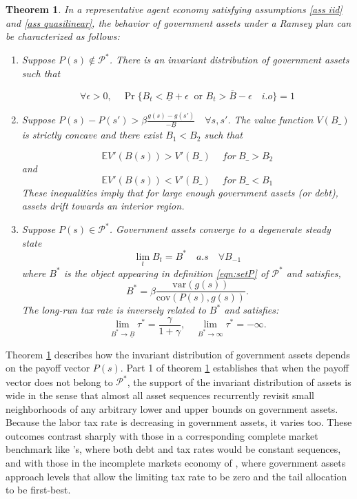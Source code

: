 \documentclass[thmsb,11pt]{article}
\newtheorem{theorem}{Theorem}
\newcommand{\var}{\mathrm{var}}
\newcommand{\cov}{\mathrm{cov}}
\begin{document}


\begin{theorem}
\label{thm: rep agent general theorem}
In a representative agent economy satisfying assumptions \ref{ass iid} and \ref{ass quasilinear}, the behavior of  government assets under a Ramsey plan
can be characterized as follows:
\begin{enumerate}
 \item Suppose $P(s) \not \in \mathcal{P}^*$.  There is an invariant distribution of government assets such that

\[\forall \epsilon>0, \quad \Pr\{B_t<\underline{B}+\epsilon  \ \text{ or } B_t>\overline{B}-\epsilon \quad i.o \}=1\]

\item Suppose  $P(s)-P(s')>\beta \frac{g(s)-g(s')}{-\underline{B}} \quad \forall s,s'$.
The value function $V(B\_)$ is strictly concave and there exist $B_1<B_2$ such that

\[\mathbb{E}V'(B(s))>V'(B\_) \quad \ for \ B\_>B_2 \]
and
\[\mathbb{E}V'(B(s))<V'(B\_) \quad \ for \  B\_<B_1 \]
These inequalities imply that for large enough government assets (or debt),
assets drift towards an interior region. %
\item Suppose $P(s)\in \mathcal{P}^*$.  Government assets converge to a degenerate steady state
\[\lim_tB_t=  B^*\quad a.s \quad \forall B_{-1} \]
where $B^*$ is the object appearing in definition \eqref{eqn:setP} of $\mathcal{P}^*$ and satisfies,
\begin{equation} \label{ss-debt} B^*=\beta \frac{\var(g(s))}{\cov(P(s),g(s))}. \end{equation}
The long-run tax rate is inversely related to $B^*$ and satisfies:
\[\lim_{B^*\to\underline{B}}\tau^*=\frac{\gamma}{1+\gamma}, \quad \lim_{B^*\to\infty}\tau^*=-\infty .\]

\end{enumerate}


\end{theorem}


\color{black}
Theorem \ref{thm: rep agent general theorem}  describes how  the invariant distribution of government assets depends on the payoff vector $P(s)$.
Part 1 of theorem \ref{thm: rep agent general theorem}  establishes that when the payoff vector does  not belong to $\mathcal{P}^*$, the support of the invariant distribution of assets is wide in the sense that almost all
asset sequences recurrently revisit  small neighborhoods of  any arbitrary lower and upper bounds on government assets.
Because the labor tax rate is decreasing in government assets, it varies too. These outcomes contrast sharply with those   in a corresponding complete market benchmark
like \citeauthor{LucasJr.1983}'s, where both debt and tax rates would be constant  sequences,  and with those in the incomplete markets economy of  \citeauthor{Aiyagari2002},
  where government assets approach levels that allow the  limiting tax rate to be zero and the tail allocation to be first-best.
\end{document}
